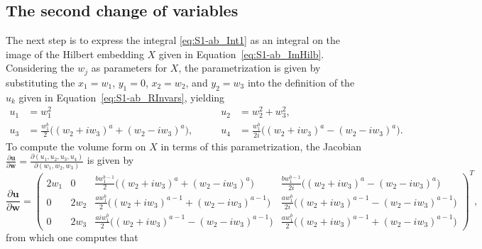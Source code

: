 \documentclass[twoside]{amsart}
\theoremstyle{definition}
\theoremstyle{remark}
\numberwithin{equation}{section}
\begin{document}

\subsection{The second change of variables}
\label{subsec:S1-ab_COV2}

The next step is to express the integral \eqref{eq:S1-ab_Int1} as an integral on the image of the Hilbert embedding $X$ given in
Equation~\eqref{eq:S1-ab_ImHilb}. Considering the $w_j$ as parameters for $X$, the parametrization is given by substituting
the $x_1 = w_1$, $y_1 = 0$, $x_2 = w_2$, and $y_2 = w_3$ into the definition of the $u_k$ given in Equation~\eqref{eq:S1-ab_RInvars},
yielding
\begin{equation}
\label{eq:S1-ab_RInvarsInW}
\begin{aligned}
    u_1 &=      w_1^2
    &
    u_2 &=      w_2^2 + w_3^2,
    \\
    u_3 &=      \frac{w_1^b}{2}\big( (w_2 + i w_3)^a + (w_2 - i w_3)^a \big),
    \qquad&
    u_4 &=      \frac{w_1^b}{2i}\big( (w_2 + i w_3)^a - (w_2 - i w_3)^a \big).
\end{aligned}
\end{equation}
To compute the volume form on $X$ in terms of this parametrization, the Jacobian
$\frac{\partial\mathbf{u}}{\partial\mathbf{w}} = \frac{\partial (u_1, u_2, u_3, u_4)}{ \partial (w_1, w_2, w_3)}$ is given by
\[
    \frac{\partial\mathbf{u}}{\partial\mathbf{w}}
    =
    \begin{pmatrix}
        2w_1 & 0 & \frac{bw_1^{b-1}}{2}\big( (w_2 + i w_3)^a + (w_2 - i w_3)^a \big) & \frac{b w_1^{b-1}}{2i}\big( (w_2 + i w_3)^a - (w_2 - i w_3)^a \big)
        \\
        0 & 2w_2 & \frac{a w_1^b}{2}\big( (w_2 + i w_3)^{a-1} + (w_2 - i w_3)^{a-1} \big) & \frac{a w_1^b}{2i}\big( (w_2 + i w_3)^{a-1} - (w_2 - i w_3)^{a-1} \big)
        \\
        0 & 2w_3 & \frac{a i w_1^b}{2}\big( (w_2 + i w_3)^{a-1} - (w_2 - i w_3)^{a-1} \big) & \frac{a w_1^b}{2}\big( (w_2 + i w_3)^{a-1} + (w_2 - i w_3)^{a-1} \big)
    \end{pmatrix}^T,
\]
from which one computes that
\end{document}
